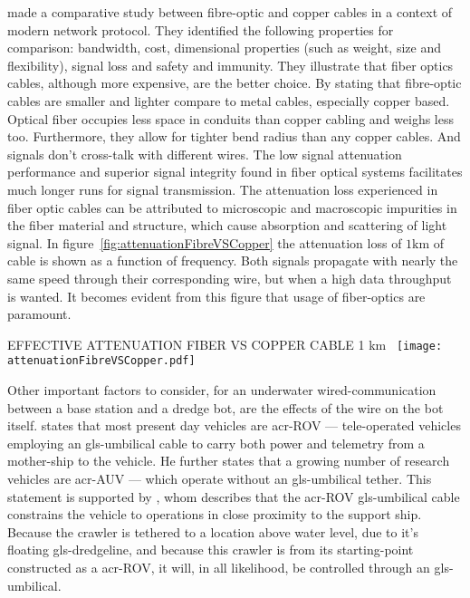 \citet{babani_comparative_nodate} made a comparative study between fibre-optic and copper cables in a context of 
modern network protocol. They identified the following properties for comparison: bandwidth, cost, dimensional 
properties (such as weight, size and flexibility), signal loss and safety and immunity.
They illustrate that fiber optics cables, although more expensive, are the better choice. By stating that fibre-optic
cables are smaller and lighter compare to metal cables, especially copper based. Optical fiber occupies less space in
conduits than copper cabling and weighs less too. Furthermore, they allow for tighter bend radius than any copper 
cables. And signals don't cross-talk with different wires.
The low signal attenuation performance and superior signal integrity found in fiber optical systems facilitates much 
longer runs for signal transmission. The attenuation loss experienced in fiber optic cables can be attributed to 
microscopic and macroscopic impurities in the fiber material and structure, which cause absorption and scattering of 
light signal.
In figure~\ref{fig:attenuationFibreVSCopper} the attenuation loss of \( 1 \si{\km} \) of cable is shown as a function
of frequency. Both signals propagate with nearly the same speed through their corresponding wire, but when a high 
data throughput is wanted. It becomes evident from this figure that usage of fiber-optics are paramount.

\begin{RoyalFigure}[htb, label=fig:attenuationFibreVSCopper]{EFFECTIVE ATTENUATION FIBER VS COPPER CABLE 1 
km~\cite{joseph_c_palais_fibre_1998}}
    \texttt{[image: attenuationFibreVSCopper.pdf]}
\end{RoyalFigure}

Other important factors to consider, for an underwater wired-communication between a base station and a dredge bot, 
are the effects of the wire on the bot itself. \citet{whitcomb_underwater_2000} states that most present day vehicles
are \gls{acr-ROV} --- tele-operated vehicles employing an \gls{gls-umbilical} cable to carry both power and telemetry
from a mother-ship to the vehicle.
He further states that a growing number of research vehicles are \gls{acr-AUV} --- which operate without an 
\gls{gls-umbilical} tether. This statement is supported by \citet{valavanis_control_1997}, whom describes that the 
\gls{acr-ROV} \gls{gls-umbilical} cable constrains the vehicle to operations in close proximity to the support ship.
Because the crawler is tethered to a location above water level, due to it's floating \gls{gls-dredgeline}, and 
because this crawler is from its starting-point constructed as a \gls{acr-ROV}, it will, in all likelihood, be 
controlled through an \gls{gls-umbilical}.

